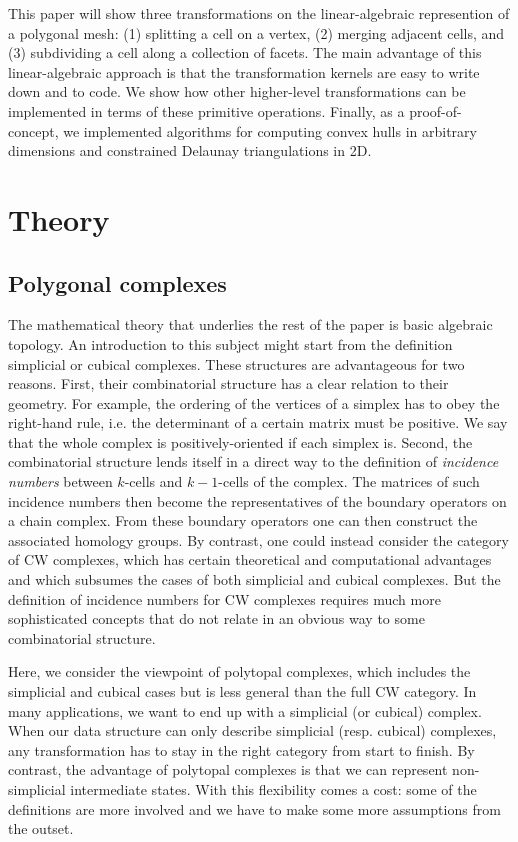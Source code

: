 \documentclass[twocolumn]{article}
\begin{document}
This paper will show three transformations on the linear-algebraic represention of a polygonal mesh: (1) splitting a cell on a vertex, (2) merging adjacent cells, and (3) subdividing a cell along a collection of facets.
The main advantage of this linear-algebraic approach is that the transformation kernels are easy to write down and to code.
We show how other higher-level transformations can be implemented in terms of these primitive operations.
Finally, as a proof-of-concept, we implemented algorithms for computing convex hulls in arbitrary dimensions and constrained Delaunay triangulations in 2D.


\section{Theory}

\subsection{Polygonal complexes}

The mathematical theory that underlies the rest of the paper is basic algebraic topology.
An introduction to this subject might start from the definition simplicial or cubical complexes.
These structures are advantageous for two reasons.
First, their combinatorial structure has a clear relation to their geometry.
For example, the ordering of the vertices of a simplex has to obey the right-hand rule, i.e. the determinant of a certain matrix must be positive.
We say that the whole complex is positively-oriented if each simplex is.
Second, the combinatorial structure lends itself in a direct way to the definition of \emph{incidence numbers} between $k$-cells and $k - 1$-cells of the complex.
The matrices of such incidence numbers then become the representatives of the boundary operators on a chain complex.
From these boundary operators one can then construct the associated homology groups.
By contrast, one could instead consider the category of CW complexes, which has certain theoretical and computational advantages and which subsumes the cases of both simplicial and cubical complexes.
But the definition of incidence numbers for CW complexes requires much more sophisticated concepts that do not relate in an obvious way to some combinatorial structure.

Here, we consider the viewpoint of polytopal complexes, which includes the simplicial and cubical cases but is less general than the full CW category.
In many applications, we want to end up with a simplicial (or cubical) complex.
When our data structure can only describe simplicial (resp. cubical) complexes, any transformation has to stay in the right category from start to finish.
By contrast, the advantage of polytopal complexes is that we can represent non-simplicial intermediate states.
With this flexibility comes a cost: some of the definitions are more involved and we have to make some more assumptions from the outset.
\end{document}
